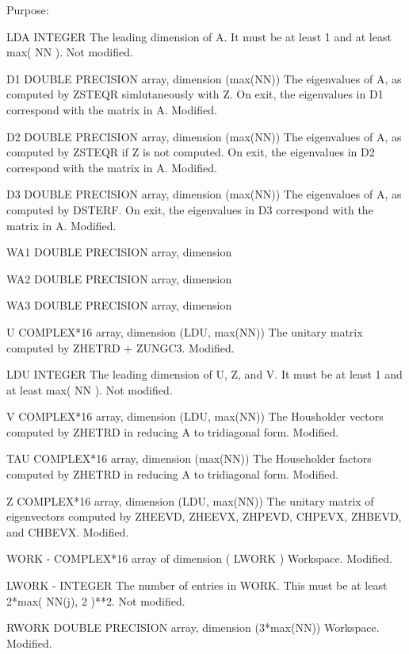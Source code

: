 \begin{DoxyParagraph}{Purpose\+: }
\begin{DoxyVerb}
  LDA     INTEGER
          The leading dimension of A.  It must be at
          least 1 and at least max( NN ).
          Not modified.

  D1      DOUBLE PRECISION array, dimension (max(NN))
          The eigenvalues of A, as computed by ZSTEQR simlutaneously
          with Z.  On exit, the eigenvalues in D1 correspond with the
          matrix in A.
          Modified.

  D2      DOUBLE PRECISION array, dimension (max(NN))
          The eigenvalues of A, as computed by ZSTEQR if Z is not
          computed.  On exit, the eigenvalues in D2 correspond with
          the matrix in A.
          Modified.

  D3      DOUBLE PRECISION array, dimension (max(NN))
          The eigenvalues of A, as computed by DSTERF.  On exit, the
          eigenvalues in D3 correspond with the matrix in A.
          Modified.

  WA1     DOUBLE PRECISION array, dimension

  WA2     DOUBLE PRECISION array, dimension

  WA3     DOUBLE PRECISION array, dimension

  U       COMPLEX*16 array, dimension (LDU, max(NN))
          The unitary matrix computed by ZHETRD + ZUNGC3.
          Modified.

  LDU     INTEGER
          The leading dimension of U, Z, and V.  It must be at
          least 1 and at least max( NN ).
          Not modified.

  V       COMPLEX*16 array, dimension (LDU, max(NN))
          The Housholder vectors computed by ZHETRD in reducing A to
          tridiagonal form.
          Modified.

  TAU     COMPLEX*16 array, dimension (max(NN))
          The Householder factors computed by ZHETRD in reducing A
          to tridiagonal form.
          Modified.

  Z       COMPLEX*16 array, dimension (LDU, max(NN))
          The unitary matrix of eigenvectors computed by ZHEEVD,
          ZHEEVX, ZHPEVD, CHPEVX, ZHBEVD, and CHBEVX.
          Modified.

  WORK  - COMPLEX*16 array of dimension ( LWORK )
           Workspace.
           Modified.

  LWORK - INTEGER
           The number of entries in WORK.  This must be at least
           2*max( NN(j), 2 )**2.
           Not modified.

  RWORK   DOUBLE PRECISION array, dimension (3*max(NN))
           Workspace.
           Modified.


\end{DoxyVerb}
\end{DoxyParagraph}

